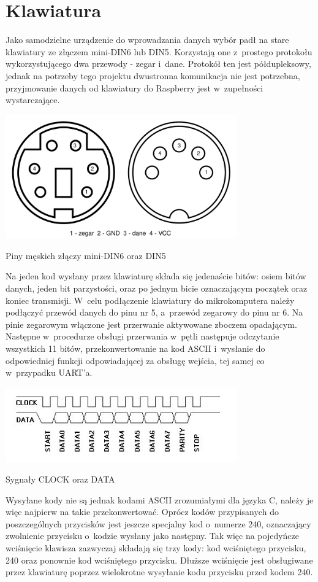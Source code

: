 \documentclass[shortabstract]{iithesis}
\begin{document}
\section{Klawiatura}
Jako samodzielne urządzenie do wprowadzania danych wybór padł na stare klawiatury ze złączem mini-DIN6 lub DIN5. Korzystają one z~prostego protokołu wykorzystującego dwa przewody - zegar i~dane. Protokół ten jest półdupleksowy, jednak na potrzeby tego projektu dwustronna komunikacja nie jest potrzebna, przyjmowanie danych od klawiatury do Raspberry jest w~zupełności wystarczające.

\begingroup
\centering
\includegraphics[width=0.75\textwidth]{pinout.png}
\captionsetup{type=figure}
\caption{Piny męskich złączy mini-DIN6 oraz DIN5}
\endgroup

Na jeden kod wysłany przez klawiaturę składa się jedenaście bitów: osiem bitów danych, jeden bit parzystości, oraz po jednym bicie oznaczającym początek oraz koniec transmisji. W~celu podłączenie klawiatury do mikrokomputera należy podłączyć przewód danych do pinu nr 5, a~przewód zegarowy do pinu nr 6. Na pinie zegarowym włączone jest przerwanie aktywowane zboczem opadającym. Następne w~procedurze obsługi przerwania w~pętli następuje odczytanie wszystkich 11 bitów, przekonwertowanie na kod ASCII i~wysłanie do odpowiedniej funkcji odpowiadającej za obsługę wejścia, tej samej co w~przypadku UART'a.

\begingroup
\centering
\includegraphics[width=0.75\textwidth]{signals.png}
\captionsetup{type=figure}
\caption{Sygnały CLOCK oraz DATA}
\endgroup

Wysyłane kody nie są jednak kodami ASCII zrozumiałymi dla języka C, należy je więc najpierw na takie przekonwertować. Oprócz kodów przypisanych do poszczególnych przycisków jest jeszcze specjalny kod o~numerze 240, oznaczający zwolnienie przycisku o~kodzie wysłany jako następny. Tak więc na pojedyńcze wciśnięcie klawisza zazwyczaj składają się trzy kody: kod wciśniętego przycisku, 240 oraz ponownie kod wciśniętego przycisku. Dłuższe wciśnięcie jest obsługiwane przez klawiaturę poprzez wielokrotne wysyłanie kodu przycisku przed kodem 240.
\end{document}

